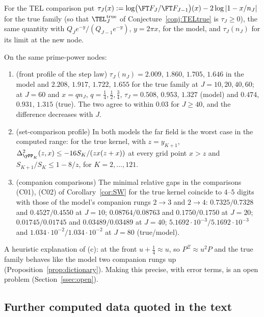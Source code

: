 For the TEL comparison put
$\tau_J(x):=\log\bigl(\FT F_J/\FT F_{J-1}\bigr)(x)-2\log|1-x/n_J|$ for the true family (so that $\TEL^{\mathrm{true}}_J$ of
Conjecture~\ref{conj:TELtrue} is $\tau_J\ge0$), the same quantity with $Q_Je^{-y}/(Q_{J-1}e^{-y})$, $y=2\pi x$, for the model,
and $\tau_J(n_J)$ for its limit at the new node.

\begin{observation}\label{obs:toy-true}
On the same prime-power nodes:
\begin{enumerate}[label=\textup{(\alph*)}]
\item \textup{(front profile of the step law)} $\tau_J(n_J)=2.009$, $1.860$, $1.705$, $1.646$ in the model and $2.208$,
$1.917$, $1.722$, $1.655$ for the true family at $J=10,20,40,60$; at $J=60$ and $x=qn_J$, $q=\frac14,\frac12,\frac34$,
$\tau_J=0.508$, $0.953$, $1.327$ (model) and $0.474$, $0.931$, $1.315$ (true). The two agree to within $0.03$ for
$J\ge40$, and the difference decreases with $J$.
\item \textup{(set-comparison profile)} In both models the far field is the worst case in the computed range: for the true kernel, with
$z=y_{K+1}$, $\Delta^2_{\yPP_K}(z,x)\le-16S_K/(zx(z+x))$ at every grid point $x>z$ and $S_{K+1}/S_K\le1-8/z$, for
$K=2,\dots,121$.
\item \textup{(companion comparisons)} The minimal relative gaps in the comparisons (C01), (C02) of
Corollary~\ref{cor:SW} for the true kernel coincide to $4$--$5$ digits with those of the model's companion rungs
$2\to3$ and $2\to4$: $0.7325/0.7328$ and $0.4527/0.4550$ at $J=10$; $0.08764/0.08763$ and $0.1750/0.1750$ at $J=20$;
$0.01745/0.01745$ and $0.03489/0.03489$ at $J=40$; $5.1692\cdot10^{-3}/5.1692\cdot10^{-3}$ and
$1.034\cdot10^{-2}/1.034\cdot10^{-2}$ at $J=80$ (true/model).
\end{enumerate}
\end{observation}

A heuristic explanation of (c): at the front $u+\frac14\approx u$, so $P^{\Xi}\approx u^2P$ and the true family behaves like
the model two companion rungs up (Proposition~\ref{prop:dictionary}). Making this precise, with error terms, is an open
problem (Section~\ref{ssec:open}).

\subsection{Further computed data quoted in the text}\label{ssec:obs-misc}

